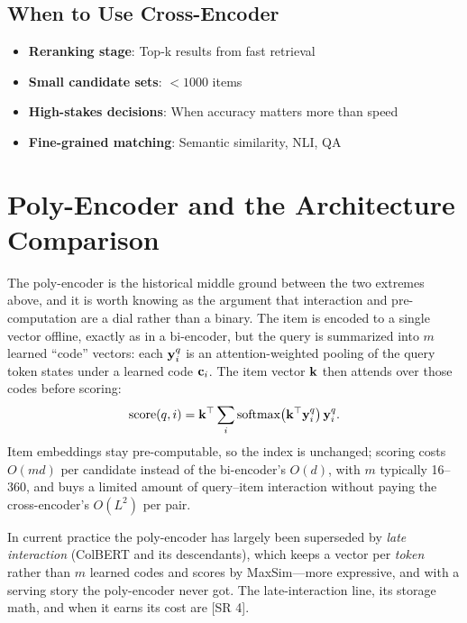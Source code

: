 \subsection{When to Use Cross-Encoder}

\begin{itemize}
    \item \textbf{Reranking stage}: Top-k results from fast retrieval
    \item \textbf{Small candidate sets}: $< 1000$ items
    \item \textbf{High-stakes decisions}: When accuracy matters more than speed
    \item \textbf{Fine-grained matching}: Semantic similarity, NLI, QA
\end{itemize}

\section{Poly-Encoder and the Architecture Comparison}
\label{sec:poly_encoder}

The poly-encoder is the historical middle ground between the two extremes above, and it is worth knowing as the argument that interaction and pre-computation are a dial rather than a binary. The item is encoded to a single vector offline, exactly as in a bi-encoder, but the query is summarized into $m$ learned ``code'' vectors: each $\mathbf{y}_i^q$ is an attention-weighted pooling of the query token states under a learned code $\mathbf{c}_i$. The item vector $\mathbf{k}$ then attends over those codes before scoring:
\begin{equation}
\text{score}(q, i) = \mathbf{k}^\top \sum_i \text{softmax}\!\left(\mathbf{k}^\top \mathbf{y}_i^q\right) \mathbf{y}_i^q .
\end{equation}
Item embeddings stay pre-computable, so the index is unchanged; scoring costs $O(md)$ per candidate instead of the bi-encoder's $O(d)$, with $m$ typically 16--360, and buys a limited amount of query--item interaction without paying the cross-encoder's $O(L^2)$ per pair.

In current practice the poly-encoder has largely been superseded by \textit{late interaction} (ColBERT and its descendants), which keeps a vector per \textit{token} rather than $m$ learned codes and scores by MaxSim---more expressive, and with a serving story the poly-encoder never got. The late-interaction line, its storage math, and when it earns its cost are [SR 4].

